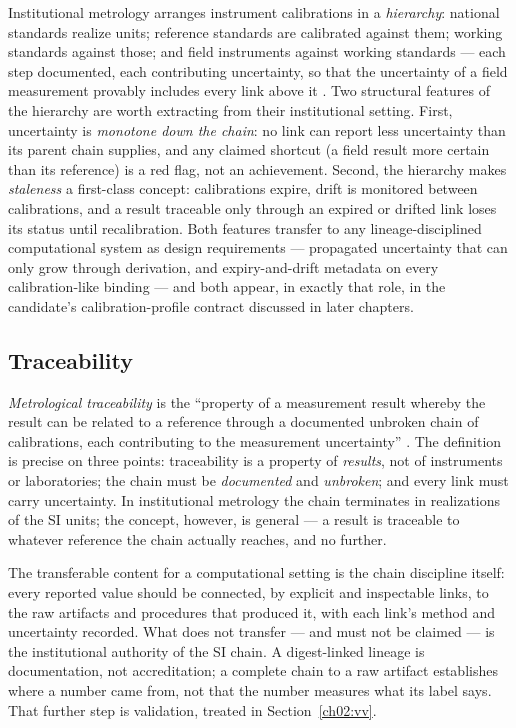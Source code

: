 Institutional metrology arranges instrument calibrations in a \emph{hierarchy}: national standards realize units; reference standards are calibrated against them; working standards against those; and field instruments against working standards --- each step documented, each contributing uncertainty, so that the uncertainty of a field measurement provably includes every link above it \cite{vim}. Two structural features of the hierarchy are worth extracting from their institutional setting. First, uncertainty is \emph{monotone down the chain}: no link can report less uncertainty than its parent chain supplies, and any claimed shortcut (a field result more certain than its reference) is a red flag, not an achievement. Second, the hierarchy makes \emph{staleness} a first-class concept: calibrations expire, drift is monitored between calibrations, and a result traceable only through an expired or drifted link loses its status until recalibration. Both features transfer to any lineage-disciplined computational system as design requirements --- propagated uncertainty that can only grow through derivation, and expiry-and-drift metadata on every calibration-like binding --- and both appear, in exactly that role, in the candidate's calibration-profile contract discussed in later chapters.

\subsection{Traceability}\label{ch02:metrology:traceability}

\emph{Metrological traceability} is the ``property of a measurement result whereby the result can be related to a reference through a documented unbroken chain of calibrations, each contributing to the measurement uncertainty'' \cite{vim}. The definition is precise on three points: traceability is a property of \emph{results}, not of instruments or laboratories; the chain must be \emph{documented} and \emph{unbroken}; and every link must carry uncertainty. In institutional metrology the chain terminates in realizations of the SI units; the concept, however, is general --- a result is traceable to whatever reference the chain actually reaches, and no further.

The transferable content for a computational setting is the chain discipline itself: every reported value should be connected, by explicit and inspectable links, to the raw artifacts and procedures that produced it, with each link's method and uncertainty recorded. What does not transfer --- and must not be claimed --- is the institutional authority of the SI chain. A digest-linked lineage is documentation, not accreditation; a complete chain to a raw artifact establishes where a number came from, not that the number measures what its label says. That further step is validation, treated in Section~\ref{ch02:vv}.

